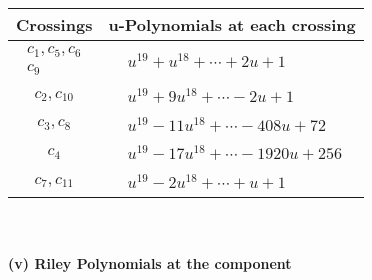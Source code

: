 \documentclass[1p]{elsarticle_modified}
\theoremstyle{definition}
\begin{document}
\begin{tabular}{m{50pt}|m{274pt}}
Crossings & \hspace{64pt}u-Polynomials at each crossing \\
\hline $$\begin{aligned}c_{1},c_{5},c_{6}\\c_{9}\end{aligned}$$&$\begin{aligned}
&u^{19}+u^{18}+\cdots+2 u+1
\end{aligned}$\\
\hline $$\begin{aligned}c_{2},c_{10}\end{aligned}$$&$\begin{aligned}
&u^{19}+9 u^{18}+\cdots-2 u+1
\end{aligned}$\\
\hline $$\begin{aligned}c_{3},c_{8}\end{aligned}$$&$\begin{aligned}
&u^{19}-11 u^{18}+\cdots-408 u+72
\end{aligned}$\\
\hline $$\begin{aligned}c_{4}\end{aligned}$$&$\begin{aligned}
&u^{19}-17 u^{18}+\cdots-1920 u+256
\end{aligned}$\\
\hline $$\begin{aligned}c_{7},c_{11}\end{aligned}$$&$\begin{aligned}
&u^{19}-2 u^{18}+\cdots+u+1
\end{aligned}$\\
\hline
\end{tabular}\\~\\
\newpage\renewcommand{\arraystretch}{1}
\flushleft \textbf{(v) Riley Polynomials at the component}\newline \\
\end{document}
